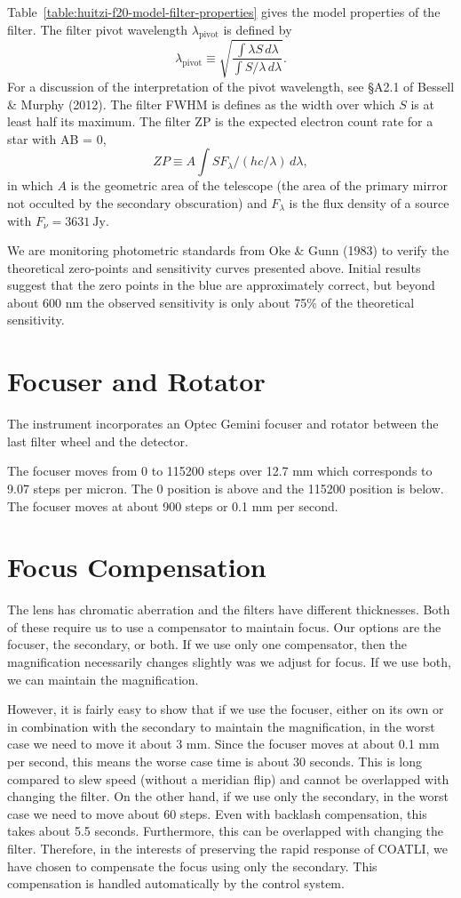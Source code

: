Table~\ref{table:huitzi-f20-model-filter-properties} gives the model properties of the filter. The filter pivot wavelength $\lambda_\mathrm{pivot}$ is  defined by 
$$
\lambda_\mathrm{pivot} \equiv \sqrt{\frac{\int \lambda S\,d\lambda}{\int S/\lambda\, d\lambda}}.
$$
For a discussion of the interpretation of the pivot wavelength, see \S A2.1 of Bessell \& Murphy (2012).
The filter FWHM is defines as the width over which $S$ is at least half its maximum. The filter ZP is the expected electron count rate for a star with AB = 0,
$$
ZP \equiv A \int S F_\lambda / (hc/\lambda)\, d\lambda,
$$
in which $A$ is the geometric area of the telescope (the area of the primary mirror not occulted by the secondary obscuration) and $F_\lambda$ is the flux density of a source with $F_\nu = \mathrm{3631~Jy}$.

We are monitoring photometric standards from Oke \& Gunn (1983) to verify the theoretical zero-points and sensitivity curves presented above. Initial results suggest that the zero points in the blue are approximately correct, but beyond about 600 nm the observed sensitivity is only about 75\% of the theoretical sensitivity.

\section{Focuser and Rotator}

The instrument incorporates an Optec Gemini focuser and rotator between the last filter wheel and the detector.

The focuser moves from 0 to 115200 steps over 12.7 mm which corresponds to 9.07 steps per micron. The 0 position is above and the 115200 position is below. The focuser moves at about 900 steps or 0.1 mm per second.

\section{Focus Compensation}

The lens has chromatic aberration and the filters have different thicknesses. Both of these require us to use a compensator to maintain focus. Our options are the focuser, the secondary, or both. If we use only one compensator, then the magnification necessarily changes slightly was we adjust for focus. If we use both, we can maintain the magnification. 

However, it is fairly easy to show that if we use the focuser, either on its own or in combination with the secondary to maintain the magnification, in the worst case we need to move it about 3 mm. Since the focuser moves at about 0.1 mm per second, this means the worse case time is about 30 seconds. This is long compared to slew speed (without a meridian flip) and cannot be overlapped with changing the filter.  On the other hand, if we use only the secondary, in the worst case we need to move about 60 steps. Even with backlash compensation, this takes about 5.5 seconds. Furthermore, this can be overlapped with changing the filter. Therefore, in the interests of preserving the rapid response of COATLI, we have chosen to compensate the focus using only the secondary. This compensation is handled automatically by the control system.

